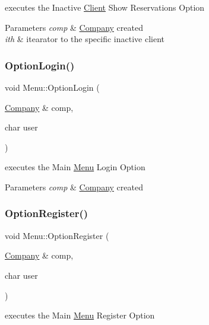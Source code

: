 executes the Inactive \hyperlink{class_client}{Client} Show Reservations Option 


\begin{DoxyParams}{Parameters}
{\em comp} & \hyperlink{class_company}{Company} created\\
\hline
{\em ith} & itearator to the specific inactive client \\
\hline
\end{DoxyParams}
\hypertarget{class_menu_adfdae8763c7eae8698af5dd02c8d65c5}{}\label{class_menu_adfdae8763c7eae8698af5dd02c8d65c5} 
\subsubsection{\texorpdfstring{Option\+Login()}{OptionLogin()}}
{\footnotesize\ttfamily void Menu\+::\+Option\+Login (\begin{DoxyParamCaption}\item[{\hyperlink{class_company}{Company} \&}]{comp,  }\item[{char}]{user }\end{DoxyParamCaption})}



executes the Main \hyperlink{class_menu}{Menu} Login Option 


\begin{DoxyParams}{Parameters}
{\em comp} & \hyperlink{class_company}{Company} created \\
\hline
\end{DoxyParams}
\hypertarget{class_menu_a61d2097ab47f782141c5357c8eb6b8d1}{}\label{class_menu_a61d2097ab47f782141c5357c8eb6b8d1} 
\subsubsection{\texorpdfstring{Option\+Register()}{OptionRegister()}}
{\footnotesize\ttfamily void Menu\+::\+Option\+Register (\begin{DoxyParamCaption}\item[{\hyperlink{class_company}{Company} \&}]{comp,  }\item[{char}]{user }\end{DoxyParamCaption})}



executes the Main \hyperlink{class_menu}{Menu} Register Option 


